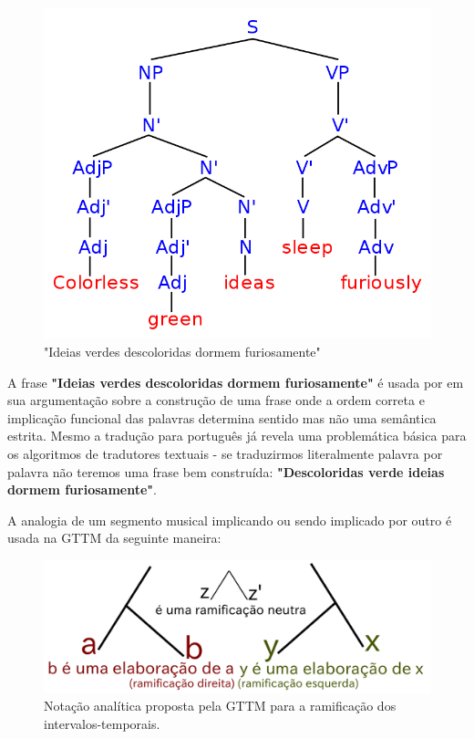 \documentclass[
	12pt,				%
	openright,			%
	twoside,			%
	a4paper,			%
	english,			%
	french,				%
	spanish,			%
	brazil				%
	]{abntex2}
\begin{document}
\begin{figure}[!h]
	\caption{\label{fig_grafico}"Ideias verdes descoloridas dormem furiosamente"\cite{chomsky1957syntactic}}
	\begin{center}
	    \includegraphics[scale=0.45]{gttm/colorless.png}
	\end{center}
\end{figure}

A frase \textbf{"Ideias verdes descoloridas dormem furiosamente"} é usada por  em sua argumentação sobre a construção de uma frase onde a ordem correta e implicação funcional das palavras determina sentido mas não uma semântica estrita. Mesmo a tradução para português já revela uma problemática básica para os algoritmos de tradutores textuais - se traduzirmos literalmente palavra por palavra não teremos uma frase bem construída: \textbf{"Descoloridas verde ideias dormem furiosamente"}.

A analogia de um segmento musical implicando ou sendo implicado por outro é usada na GTTM da seguinte maneira:

\begin{figure}[htb]
	\caption{\label{fig_grafico}Notação analítica proposta pela GTTM para a ramificação dos intervalos-temporais.}
	\begin{center}
	    \includegraphics[scale=0.5]{gttm/ramificacoes_arvore.pdf}
	\end{center}
\end{figure}
\end{document}

